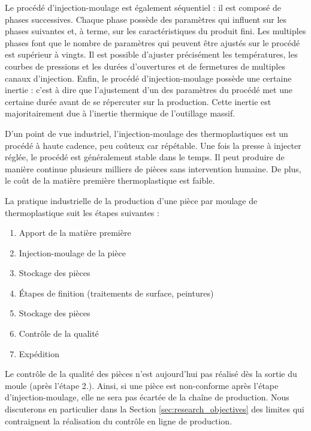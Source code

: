 Le procédé d'injection-moulage est également séquentiel : il est composé de phases successives.
Chaque phase possède des paramètres qui influent sur les phases suivantes et, à terme, sur les caractéristiques du produit fini.
Les multiples phases font que le nombre de paramètres qui peuvent être ajustés sur le procédé est supérieur à vingts.
Il est possible d’ajuster précisément les températures, les courbes de pressions et les durées d’ouvertures et de fermetures de multiples canaux d’injection.  %
Enfin, le procédé d'injection-moulage possède une certaine inertie : c'est à dire que l'ajustement d'un des paramètres du procédé met une certaine durée avant de se répercuter sur la production.
Cette inertie est majoritairement due à l'inertie thermique de l'outillage massif.



D'un point de vue industriel, l’injection-moulage des thermoplastiques est un procédé à haute cadence, peu coûteux car répétable.
Une fois la presse à injecter réglée, le procédé est généralement stable dans le temps.
Il peut produire de manière continue plusieurs milliers de pièces sans intervention humaine.
De plus, le coût de la matière première thermoplastique est faible.

La pratique industrielle de la production d'une pièce par moulage de thermoplastique suit les étapes suivantes :
\begin{enumerate}
	\item Apport de la matière première
	\item Injection-moulage de la pièce
	\item Stockage des pièces
	\item Étapes de finition (traitements de surface, peintures) 
	\item Stockage des pièces
	\item Contrôle de la qualité
	\item Expédition
\end{enumerate}
Le contrôle de la qualité des pièces n'est aujourd'hui pas réalisé dès la sortie du moule (après l'étape 2.).
Ainsi, si une pièce est non-conforme après l'étape d'injection-moulage, elle ne sera pas écartée de la chaîne de production.
Nous discuterons en particulier dans la Section \ref{sec:research_objectives} des limites qui contraignent la réalisation du contrôle en ligne de production.

